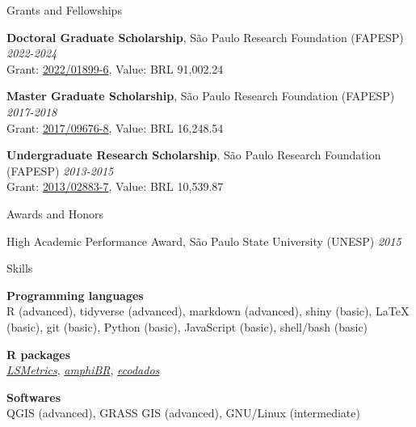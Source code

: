 \documentclass{resume}
\begin{document}

\begin{rSection}{Grants and Fellowships} 

{\bf Doctoral Graduate Scholarship}{, São Paulo Research Foundation (FAPESP)
} \hfill{\em 2022-2024} 
\\ Grant: \href{https://bv.fapesp.br/en/bolsas/203713/landscape-structure-as-a-predictor-of-taxonomic-and-functional-diversity-of-amphibians-in-the-atlant/}{2022/01899-6}, Value: BRL 91,002.24

{\bf Master Graduate Scholarship}{, São Paulo Research Foundation (FAPESP)
} \hfill{\em 2017-2018} 
\\ Grant: \href{https://bv.fapesp.br/en/bolsas/172826/effect-of-landscape-modifications-and-climate-changes-on-the-persistence-of-amphibians-in-the-atlant/}{2017/09676-8}, Value: BRL 16,248.54

{\bf Undergraduate Research Scholarship}{, São Paulo Research Foundation (FAPESP)
} \hfill{\em 2013-2015} 
\\ Grant: \href{https://bv.fapesp.br/en/bolsas/142421/effect-of-fragmentation-on-the-persistence-of-anuran-amphibians-amphibia-anura-within-the-atlanti/}{2013/02883-7}, Value: BRL 10,539.87

\end{rSection}


\begin{rSection}{Awards and Honors} 

{High Academic Performance Award, São Paulo State University (UNESP)} \hfill{\em 2015}

\end{rSection}


\begin{rSection}{Skills}

{\bf Programming languages}
\\ R (advanced), tidyverse (advanced), markdown (advanced), shiny (basic), LaTeX (basic), git (basic), Python (basic), JavaScript (basic), shell/bash (basic)

{\bf R packages}
\\ \href{https://mauriciovancine.github.io/lsmetrics}{\it LSMetrics}, \href{https://paulobarros.github.io/amphiBR}{\it amphiBR}, \href{https://paternogbc.github.io/ecodados/}{\it ecodados}

{\bf Softwares}
\\ QGIS (advanced), GRASS GIS (advanced), GNU/Linux (intermediate)

\end{rSection}
\end{document}
